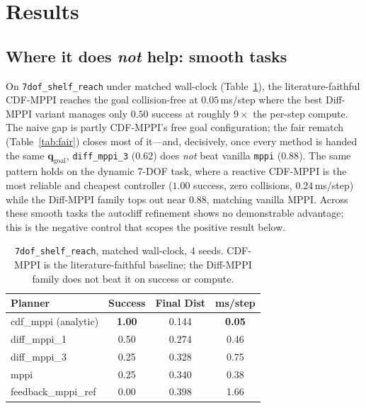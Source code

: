 \documentclass[journal]{IEEEtran}
\begin{document}
\section{Results}
\label{sec:results}

\subsection{Where it does \emph{not} help: smooth tasks}
\label{sec:results_smooth}

On \texttt{7dof\_shelf\_reach} under matched wall-clock
(Table~\ref{tab:cdf_reach}), the literature-faithful CDF-MPPI reaches the goal
collision-free at $0.05$\,ms/step where the best Diff-MPPI variant manages only
$0.50$ success at roughly $9\times$ the per-step compute. The naive gap is
partly CDF-MPPI's free goal configuration; the fair rematch
(Table~\ref{tab:fair}) closes most of it---and, decisively, once every method is
handed the same $\mathbf{q}_{\text{goal}}$, \texttt{diff\_mppi\_3} ($0.62$) does
\emph{not} beat vanilla \texttt{mppi} ($0.88$). The same pattern holds on the
dynamic 7-DOF task, where a reactive CDF-MPPI is the most reliable and cheapest
controller ($1.00$ success, zero collisions, $0.24$\,ms/step) while the
Diff-MPPI family tops out near $0.88$, matching vanilla MPPI. Across these smooth
tasks the autodiff refinement shows no demonstrable advantage; this is the
negative control that scopes the positive result below.

\begin{table}[t]
\centering
\caption{%
  \texttt{7dof\_shelf\_reach}, matched wall-clock, 4 seeds. CDF-MPPI is the
  literature-faithful baseline; the Diff-MPPI family does not beat it on success
  or compute.%
}
\label{tab:cdf_reach}
\begin{tabular}{lccc}
\toprule
Planner & Success & Final Dist & ms/step \\
\midrule
cdf\_mppi (analytic)   & \textbf{1.00} & 0.144 & \textbf{0.05} \\
diff\_mppi\_1          & 0.50 & 0.274 & 0.46 \\
diff\_mppi\_3          & 0.25 & 0.328 & 0.75 \\
mppi                   & 0.25 & 0.340 & 0.38 \\
feedback\_mppi\_ref    & 0.00 & 0.398 & 1.66 \\
\bottomrule
\end{tabular}
\end{table}
\end{document}
